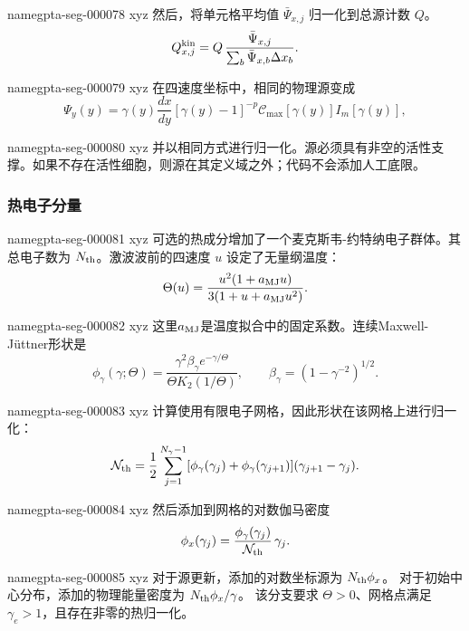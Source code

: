 \documentclass[twocolumn]{aastex702}
\makeatletter
\providecommand{\gptareaderanchor}[1]{\pdfdest name{#1} xyz}%
\providecommand{\gptareaderanchor}[1]{\special{pdf:dest (#1) [ @thispage /XYZ @xpos @ypos null ]}}%
\makeatother
\begin{document}
\gptareaderanchor{gpta-seg-000078}%
然后，将单元格平均值 \(\bar\Psi_{x,j}\) 归一化到总源计数 \(Q\)。
\begin{equation}
Q_{x,j}^{\rm kin}=Q\,
\frac{\bar\Psi_{x,j}}
{\sum_b \bar\Psi_{x,b}\Delta x_b}.
\end{equation}

\gptareaderanchor{gpta-seg-000079}%
在四速度坐标中，相同的物理源变成
\begin{equation}
\Psi_y(y)=\gamma(y)\frac{dx}{dy}
[\gamma(y)-1]^{-p}
\mathcal{C}_{\max}[\gamma(y)]I_m[\gamma(y)],
\end{equation}

\gptareaderanchor{gpta-seg-000080}%
并以相同方式进行归一化。源必须具有非空的活性支撑。如果不存在活性细胞，则源在其定义域之外；代码不会添加人工底限。

\subsubsection{热电子分量}


\gptareaderanchor{gpta-seg-000081}%
可选的热成分增加了一个麦克斯韦-约特纳电子群体。其总电子数为 \(N_{\rm th}\)。激波波前的四速度 \(u\) 设定了无量纲温度：
\begin{equation}
\Theta(u)=
\frac{u^2(1+a_{\rm MJ}u)}{3(1+u+a_{\rm MJ}u^2)} .
\end{equation}

\gptareaderanchor{gpta-seg-000082}%
这里\(a_{\rm MJ}\)是温度拟合中的固定系数。连续Maxwell-Jüttner形状是
\begin{equation}
\phi_\gamma(\gamma;\Theta)=
\frac{\gamma^2\beta_\gamma e^{-\gamma/\Theta}}
{\Theta K_2(1/\Theta)},
\qquad
\beta_\gamma=(1-\gamma^{-2})^{1/2}.
\end{equation}

\gptareaderanchor{gpta-seg-000083}%
计算使用有限电子网格，因此形状在该网格上进行归一化：
\begin{equation}
\mathcal{N}_{\rm th}=
\frac{1}{2}\sum_{j=1}^{N_\gamma-1}
[\phi_\gamma(\gamma_j)+\phi_\gamma(\gamma_{j+1})]
(\gamma_{j+1}-\gamma_j).
\end{equation}

\gptareaderanchor{gpta-seg-000084}%
然后添加到网格的对数伽马密度
\begin{equation}
\phi_x(\gamma_j)=
\frac{\phi_\gamma(\gamma_j)}{\mathcal{N}_{\rm th}}\,
\gamma_j .
\end{equation}

\gptareaderanchor{gpta-seg-000085}%
对于源更新，添加的对数坐标源为 \(N_{\rm th}\phi_x\)。
对于初始中心分布，添加的物理能量密度为 \(N_{\rm th}\phi_x/\gamma\)。
该分支要求 \(\Theta>0\)、网格点满足 \(\gamma_e>1\)，且存在非零的热归一化。
\end{document}
